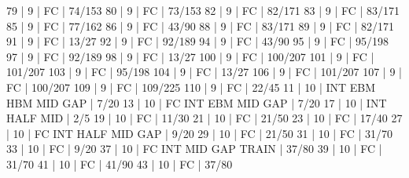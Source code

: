 79    |  9     |    FC                                        | 74/153   
80    |  9     |    FC                                        | 73/153   
82    |  9     |    FC                                        | 82/171   
83    |  9     |    FC                                        | 83/171   
85    |  9     |    FC                                        | 77/162   
86    |  9     |    FC                                        | 43/90   
88    |  9     |    FC                                        | 83/171   
89    |  9     |    FC                                        | 82/171   
91    |  9     |    FC                                        | 13/27   
92    |  9     |    FC                                        | 92/189   
94    |  9     |    FC                                        | 43/90   
95    |  9     |    FC                                        | 95/198   
97    |  9     |    FC                                        | 92/189   
98    |  9     |    FC                                        | 13/27   
100   |  9     |    FC                                        | 100/207   
101   |  9     |    FC                                        | 101/207   
103   |  9     |    FC                                        | 95/198   
104   |  9     |    FC                                        | 13/27   
106   |  9     |    FC                                        | 101/207   
107   |  9     |    FC                                        | 100/207   
109   |  9     |    FC                                        | 109/225   
110   |  9     |    FC                                        | 22/45   
11    |  10    |        INT        EBM  HBM  MID  GAP         | 7/20   
13    |  10    |    FC  INT        EBM       MID  GAP         | 7/20   
17    |  10    |        INT  HALF            MID              | 2/5   
19    |  10    |    FC                                        | 11/30   
21    |  10    |    FC                                        | 21/50   
23    |  10    |    FC                                        | 17/40   
27    |  10    |    FC  INT  HALF            MID  GAP         | 9/20   
29    |  10    |    FC                                        | 21/50   
31    |  10    |    FC                                        | 31/70   
33    |  10    |    FC                                        | 9/20   
37    |  10    |    FC  INT                  MID  GAP  TRAIN  | 37/80   
39    |  10    |    FC                                        | 31/70   
41    |  10    |    FC                                        | 41/90   
43    |  10    |    FC                                        | 37/80   
